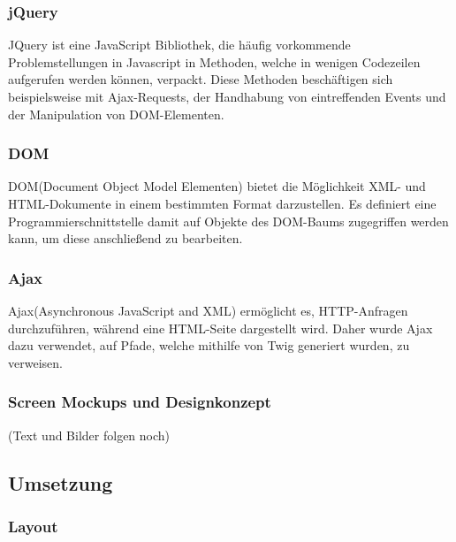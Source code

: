     \subsubsection{jQuery}

	JQuery ist eine JavaScript Bibliothek, die häufig vorkommende Problemstellungen in Javascript in Methoden, welche in wenigen Codezeilen aufgerufen werden können, verpackt. Diese Methoden beschäftigen sich beispielsweise mit Ajax-Requests, der Handhabung von eintreffenden Events und der Manipulation von DOM-Elementen.

    \subsubsection{DOM}

	DOM(Document Object Model Elementen) bietet die Möglichkeit XML- und HTML-Dokumente in einem bestimmten Format darzustellen. Es definiert eine Programmierschnittstelle damit auf Objekte des DOM-Baums zugegriffen werden kann, um diese anschließend zu bearbeiten.

    \subsubsection{Ajax}

	Ajax(Asynchronous JavaScript and XML) ermöglicht es, HTTP-Anfragen durchzuführen, während eine HTML-Seite dargestellt wird. Daher wurde Ajax dazu verwendet, auf Pfade, welche mithilfe von Twig generiert wurden, zu verweisen.

    \subsubsection{Screen Mockups und Designkonzept}

	(Text und Bilder folgen noch)

  \subsection{Umsetzung}

    \subsubsection{Layout}

